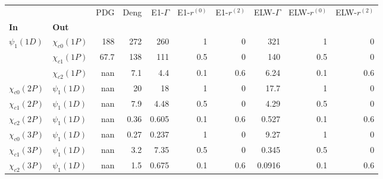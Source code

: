 \begin{tabular}{l|l|r|r|r|r|r|r|r|r}
\toprule
                &                &  PDG &  Deng &  E1-$\Gamma$ &  E1-$r^{(0)}$ &  E1-$r^{(2)}$ &  ELW-$\Gamma$ &  ELW-$r^{(0)}$ &  ELW-$r^{(2)}$ \\
\textbf{In} & \textbf{Out} &      &       &              &               &               &               &                &                \\
\midrule
\textbf{$\psi_{1}(1D)$} & \textbf{$\chi_{c0}(1P)$} &  188 &   272 &          260 &             1 &             0 &           321 &              1 &              0 \\
                & \textbf{$\chi_{c1}(1P)$} & 67.7 &   138 &          111 &           0.5 &             0 &           140 &            0.5 &              0 \\
                & \textbf{$\chi_{c2}(1P)$} &  nan &   7.1 &          4.4 &           0.1 &           0.6 &          6.24 &            0.1 &            0.6 \\
\textbf{$\chi_{c0}(2P)$} & \textbf{$\psi_{1}(1D)$} &  nan &    20 &           18 &             1 &             0 &          17.7 &              1 &              0 \\
\textbf{$\chi_{c1}(2P)$} & \textbf{$\psi_{1}(1D)$} &  nan &   7.9 &         4.48 &           0.5 &             0 &          4.29 &            0.5 &              0 \\
\textbf{$\chi_{c2}(2P)$} & \textbf{$\psi_{1}(1D)$} &  nan &  0.36 &        0.605 &           0.1 &           0.6 &         0.527 &            0.1 &            0.6 \\
\textbf{$\chi_{c0}(3P)$} & \textbf{$\psi_{1}(1D)$} &  nan &  0.27 &        0.237 &             1 &             0 &          9.27 &              1 &              0 \\
\textbf{$\chi_{c1}(3P)$} & \textbf{$\psi_{1}(1D)$} &  nan &   3.2 &         7.35 &           0.5 &             0 &         0.345 &            0.5 &              0 \\
\textbf{$\chi_{c2}(3P)$} & \textbf{$\psi_{1}(1D)$} &  nan &   1.5 &        0.675 &           0.1 &           0.6 &        0.0916 &            0.1 &            0.6 \\
\bottomrule
\end{tabular}
